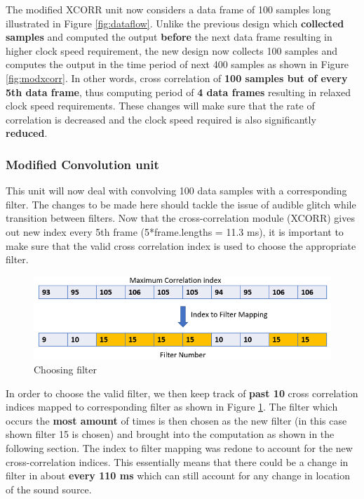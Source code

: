 \documentclass[BTech]{nitkdiss}
\begin{document}
The modified XCORR unit now considers a data frame of 100 samples long illustrated in Figure \ref{fig:dataflow}. Unlike the previous design which \textbf{collected samples} and computed the output \textbf{before} the next data frame resulting in higher clock speed requirement, the new design now collects 100 samples and computes the output in the time period of next 400 samples as shown in Figure \ref{fig:modxcorr}. In other words, cross correlation of \textbf{100 samples but of every 5th data frame}, thus computing period of \textbf{4 data frames} resulting in relaxed clock speed requirements. These changes will make sure that the rate of correlation is decreased and the clock speed required is also significantly \textbf{reduced}. 

\subsubsection{Modified Convolution unit}

This unit will now deal with convolving 100 data samples with a corresponding filter. The changes to be made here should tackle the issue of audible glitch while transition between filters. Now that the cross-correlation module (XCORR) gives out new index every 5th frame (5*frame.lengths = 11.3 ms), it is important to make sure that the valid cross correlation index is used to choose the appropriate filter.

\begin{figure}[h!]
    \centering
    \includegraphics{index_2_filter.png}
    \caption{Choosing filter}
    \label{fig:index2filter}
\end{figure}

In order to choose the valid filter, we then keep track of \textbf{past 10} cross correlation indices mapped to corresponding filter as shown in Figure \ref{fig:index2filter}. The filter which occurs the \textbf{most amount} of times is then chosen as the new filter (in this case shown filter 15 is chosen) and brought into the computation as shown in the following section. The index to filter mapping was redone to account for the new cross-correlation indices. This essentially means that there could be a change in filter in about \textbf{every 110 ms} which can still account for any change in location of the sound source. 
\end{document}
